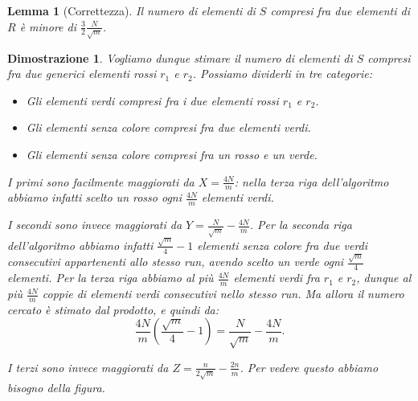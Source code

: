 \documentclass[a4paper, 11pt]{article}
\theoremstyle{plain}
\newtheorem{lemma}{Lemma}
\newtheorem*{proof*}{Dimostrazione}
\begin{document}
    \begin{lemma}[Correttezza]
        Il numero di elementi di \(S\) compresi fra due elementi di \(R\) \`e
        minore di \(\frac{3}{2}\frac{N}{\sqrt{m}}\).
    \end{lemma}
    \begin{proof*}
        Vogliamo dunque stimare il numero di elementi di \(S\) compresi fra
        due generici elementi rossi \(r_1\) e \(r_2\). Possiamo dividerli in
        tre categorie:
        \begin{itemize}
            \item Gli elementi \emph{verdi} compresi fra i due elementi rossi \(r_1\) e \(r_2\).
            \item Gli elementi \emph{senza colore} compresi fra due elementi verdi.
            \item Gli elementi \emph{senza colore} compresi fra un rosso e un verde.
        \end{itemize}
        
        I primi sono facilmente maggiorati da \(X = \frac{4N}{m}\): nella 
        terza riga dell'algoritmo abbiamo infatti scelto un rosso ogni 
        \(\frac{4N}{m}\) elementi verdi.
        
        I secondi sono invece maggiorati da \(Y = \frac{N}{\sqrt{m}} - \frac{4N}{m}\). Per la seconda riga dell'algoritmo abbiamo infatti 
        \(\frac{\sqrt{m}}{4}-1\) elementi senza colore fra due verdi
        consecutivi appartenenti allo stesso run, avendo scelto un verde ogni
        \(\frac{\sqrt{m}}{4}\) elementi. Per la terza riga abbiamo al pi\`u
        \(\frac{4N}{m}\) elementi verdi fra \(r_1\) e \(r_2\), dunque al
        pi\`u \(\frac{4N}{m}\) coppie di elementi verdi consecutivi nello
        stesso run. Ma allora il numero cercato \`e stimato dal prodotto, e 
        quindi da:
        \[
            \frac{4N}{m}\left(\frac{\sqrt{m}}{4}-1\right) = \frac{N}{\sqrt{m}} - \frac{4N}{m}\mbox{.}
        \]
        
        I terzi sono invece maggiorati da \(Z = \frac{n}{2\sqrt{m}} - \frac{2n}{m}\). Per vedere questo abbiamo bisogno della figura.
        \begin{figure}
            \centering
\end{figure}
\end{proof*}
\end{document}
